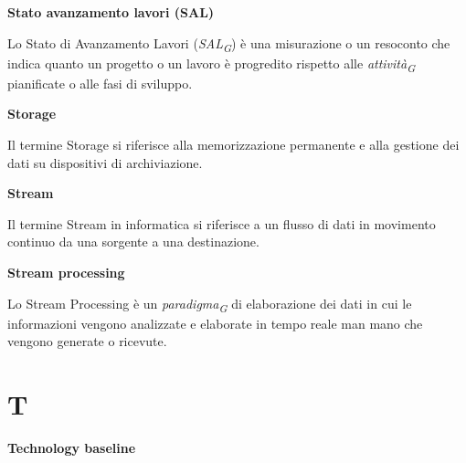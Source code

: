 \documentclass{article}
\begin{document}
\vspace{0.4cm}

\textbf{Stato avanzamento lavori (SAL)}

\vspace{0.1cm}

Lo Stato di Avanzamento Lavori (\textit{SAL}\textsubscript{\textit{G}}) è una misurazione o un resoconto che indica quanto un progetto o un lavoro è progredito rispetto alle \textit{attività}\textsubscript{\textit{G}} pianificate o alle fasi di sviluppo.

\vspace{0.4cm}

\textbf{Storage}

\vspace{0.1cm}

Il termine Storage si riferisce alla memorizzazione permanente e alla gestione dei dati su dispositivi di archiviazione.

\vspace{0.4cm}

\textbf{Stream}

\vspace{0.1cm}

Il termine Stream in informatica si riferisce a un flusso di dati in movimento continuo da una sorgente a una destinazione.

\vspace{0.4cm}

\textbf{Stream processing}

\vspace{0.1cm}

Lo Stream Processing è un \textit{paradigma}\textsubscript{\textit{G}} di elaborazione dei dati in cui le informazioni vengono analizzate e elaborate in tempo reale man mano che vengono generate o ricevute.

\pagebreak
\section*{T}
{}

\vspace{0.4cm}

\textbf{Technology baseline}

\vspace{0.1cm}
\end{document}
